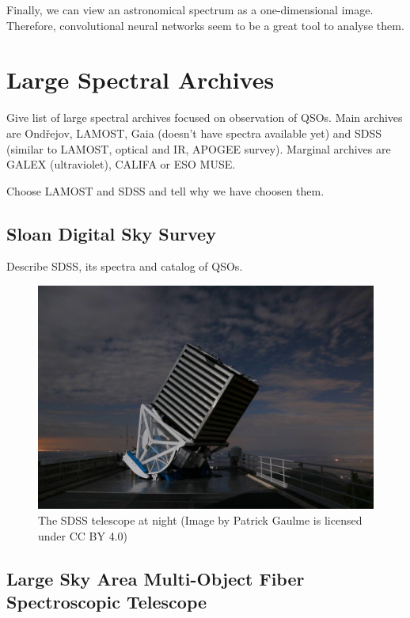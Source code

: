 \documentclass[thesis=M,english]{FITthesis}[2012/10/20]
\begin{document}
Finally, we can view an astronomical spectrum as a one-dimensional image.
Therefore, convolutional neural networks seem to be a great tool to analyse them.

\section{Large Spectral Archives}

Give list of large spectral archives focused on observation of QSOs.
Main archives are Ondřejov, LAMOST, Gaia (doesn't have spectra available yet)
and SDSS (similar to LAMOST, optical and IR, APOGEE survey).
Marginal archives are GALEX (ultraviolet), CALIFA or ESO MUSE.

Choose LAMOST and SDSS and tell why we have choosen them.

\subsection{Sloan Digital Sky Survey}

Describe SDSS, its spectra and catalog of QSOs.

\begin{figure}
	\includegraphics[width=\textwidth]{img/sdss_gaulme.jpg}
	\caption{The SDSS telescope at night (Image by Patrick Gaulme is licensed under CC BY 4.0)}
	\label{solar_spectrum}
\end{figure}

\subsection{Large Sky Area Multi-Object Fiber Spectroscopic Telescope}
\end{document}
